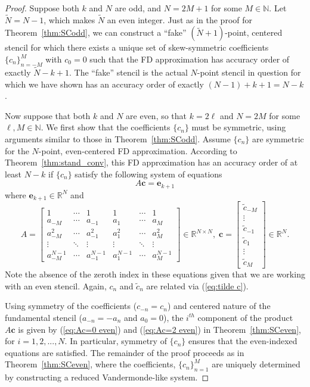\documentclass[12pt]{article}
\newcommand{\N}{\mathbb{N}}
\newcommand{\R}{\mathbb{R}}
\begin{document}
\begin{proof} 
Suppose both $k$ and $N$ are odd, and $N=2M+1$ for some $M\in\N$.
Let $\tilde N = N-1$, which makes $\tilde N$ an even integer.
Just as in the proof for Theorem~\ref{thm:SCodd}, we can construct a ``fake'' $(\tilde N+1)$-point, centered stencil for which there exists a unique set of skew-symmetric coefficients $\{c_n\}_{n=-M}^M$ with $c_0=0$ such that the FD approximation has accuracy order of exactly $\tilde N-k+1$.
The ``fake'' stencil is the actual $N$-point stencil in question for which we have shown has an accuracy order of exactly $(N-1)+k+1=N-k$.

Now suppose that both $k$ and $N$ are even, so that $k=2\ell$ and $N=2M$ for some $\ell,M\in\N$.
We first show that the coefficients $\{c_n\}$ must be symmetric, using arguments similar to those in Theorem~\ref{thm:SCodd}.
Assume $\{c_n\}$ are symmetric for the $N$-point, even-centered FD approximation.
According to Theorem~\ref{thm:stand_conv}, this FD approximation has an accuracy order of at least $N-k$ if $\{c_n\}$ satisfy the following system of equations
\[
	A\mathbf c = \mathbf e_{k+1}
\]
where $\mathbf e_{k+1}\in\R^{N}$ and
\[
	A = \begin{bmatrix}
		1 & \cdots & 1 & 1 & \cdots & 1\\
		a_{-M} & \cdots & a_{-1} & a_{1} & \cdots & a_M\\
		a_{-M}^2 & \cdots & a_{-1}^2 & a_{1}^2 & \cdots & a_M^2\\
		\vdots & \ddots & \vdots & \vdots & \ddots & \vdots\\
		a_{-M}^{N-1} & \cdots & a_{-1}^{N-1} & a_{1}^{N-1} & \cdots & a_M^{N-1}
	\end{bmatrix}\in\R^{N\times N}, \;
	\mathbf c = \begin{bmatrix}
		\tilde c_{-M}\\ \vdots \\ \tilde c_{-1} \\ \tilde c_{1}\\ \vdots \\ \tilde c_{M}
	\end{bmatrix}\in\R^N.
\]
Note the absence of the zeroth index in these equations given that we are working with an even stencil.
Again, $c_n$ and $\tilde c_n$ are related via (\ref{eq:tilde c}).

Using symmetry of the coefficients ($c_{-n}=c_{n}$) and centered nature of the fundamental stencil ($a_{-n}=-a_n$ and $a_0=0$), the $i^{th}$ component of the product $A\mathbf c$ is given by (\ref{eq:Ac=0 even}) and (\ref{eq:Ac=2 even}) in Theorem~\ref{thm:SCeven}, for $i=1,2,...,N$.
In particular, symmetry of $\{c_n\}$ ensures that the even-indexed equations are satisfied.
The remainder of the proof proceeds as in Theorem~\ref{thm:SCeven}, where the coefficients, $\{c_n\}_{n=1}^{M}$ are uniquely determined by constructing a reduced Vandermonde-like system.


\end{proof}
\end{document}
